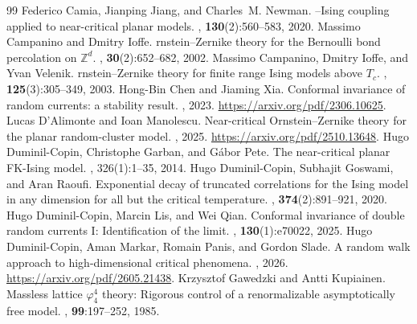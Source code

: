 \documentclass[10pt,a4paper]{amsart}
\numberwithin{equation}{section}
\begin{document}
\begin{thebibliography}{99}
 Federico Camia, Jianping Jiang, and Charles~M. Newman. --{I}sing coupling applied to near-critical planar models. , {\bf 130}(2):560--583, 2020.
 Massimo Campanino and Dmitry Ioffe. rnstein--{Z}ernike theory for the {B}ernoulli bond percolation on $\mathbb{Z}^d$. , \textbf{30}(2):652--682, 2002.
 Massimo Campanino, Dmitry Ioffe, and Yvan Velenik. rnstein--{Z}ernike theory for finite range {I}sing models above ${T}_c$. , \textbf{125}(3):305--349, 2003.
 Hong-Bin Chen and Jiaming Xia. \newblock Conformal invariance of random currents: a stability result. , 2023. \newblock \url{https://arxiv.org/pdf/2306.10625}.
 Lucas D'Alimonte and Ioan Manolescu. \newblock Near-critical {O}rnstein--{Z}ernike theory for the planar random-cluster model. , 2025. \newblock \url{https://arxiv.org/pdf/2510.13648}.
 Hugo Duminil-Copin, Christophe Garban, and G{\'a}bor Pete. \newblock The near-critical planar {FK}-{I}sing model. , 326(1):1--35, 2014.
 Hugo Duminil-Copin, Subhajit Goswami, and Aran Raoufi. \newblock Exponential decay of truncated correlations for the {I}sing model in any dimension for all but the critical temperature. , \textbf{374}(2):891--921, 2020.
 Hugo Duminil-Copin, Marcin Lis, and Wei Qian. \newblock Conformal invariance of double random currents {I}: Identification of the limit. , \textbf{130}(1):e70022, 2025.
 Hugo Duminil-Copin, Aman Markar, Romain Panis, and Gordon Slade. \newblock A random walk approach to high-dimensional critical phenomena. , 2026. \newblock \url{https://arxiv.org/pdf/2605.21438}.
 Krzysztof Gawedzki and Antti Kupiainen. \newblock Massless lattice $\varphi^4_4$ theory: {R}igorous control of a renormalizable asymptotically free model. , \textbf{99}:197--252, 1985.

\end{thebibliography}
\end{document}
